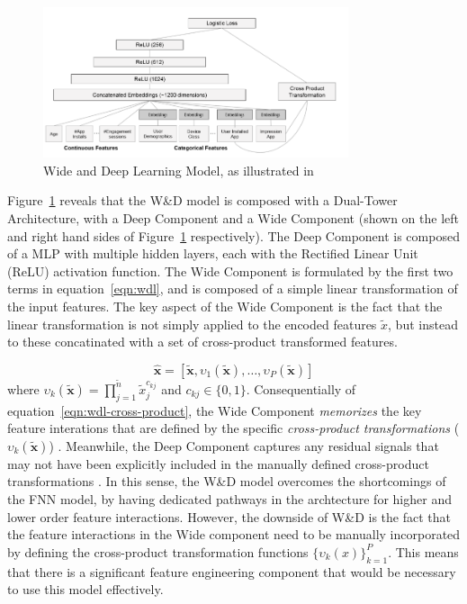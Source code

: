 \documentclass{mldsmsc}
\begin{document}
\begin{figure}[h]
\centering
\includegraphics[width = 0.8\textwidth]{../figures/wdl.png}
\caption{Wide and Deep Learning Model, as illustrated in \citep{RefWorks:shen2017deepctr:}}
\label{fig:wdl}
\end{figure}
Figure~\ref{fig:wdl} reveals that the W\&D model is composed with a Dual-Tower Architecture,
with a Deep Component and a Wide Component (shown on the left and right hand sides of Figure~\ref{fig:wdl}
respectively). The Deep Component is composed of a MLP with multiple hidden layers, each
with the Rectified Linear Unit (ReLU) activation function. The Wide Component is formulated
by the first two terms in equation~\ref{eqn:wdl}, and is composed of a simple linear transformation
of the input features. The key aspect of the Wide Component is the fact that the 
linear transformation is not simply applied to the encoded features $\tilde{x}$,
but instead to these concatinated with a set of cross-product transformed features.

\begin{equation}
\label{eqn:wdl-cross-product}
\hat{\mathbf{x}} = [\tilde{\mathbf{x}}, \upsilon_1({\tilde{\mathbf{x}}}),\ldots , \upsilon_P({\tilde{\mathbf{x}}})]
\end{equation}
where $\upsilon_k({\tilde{\mathbf{x}}}) = \prod_{j=1}^{\tilde{n}}\tilde{x}_j^{c_{kj}}$
and $c_{kj} \in \{ 0, 1 \}$. Consequentially of equation~\ref{eqn:wdl-cross-product}, the Wide Component \emph{memorizes}
the key feature interations that are defined by the specific \emph{cross-product transformations}
($\upsilon_{k}(\tilde{\mathbf{x}})$) \citep{RefWorks:cheng2016wide}. Meanwhile, the Deep Component captures any residual
signals that may not have been explicitly included in the manually defined cross-product transformations
\citep{RefWorks:zhang2021deep}. In this sense, the W\&D model overcomes the
shortcomings of the FNN model, by having dedicated pathways in the archtecture
for higher and lower order feature interactions. However, the downside
of W\&D is the fact that the feature interactions in the Wide component
need to be manually incorporated by defining the cross-product transformation
functions $\{\upsilon_k(x)\}_{k=1}^{P}$. This means that there is a significant
feature engineering component that would be necessary to use this model effectively. 
\end{document}
